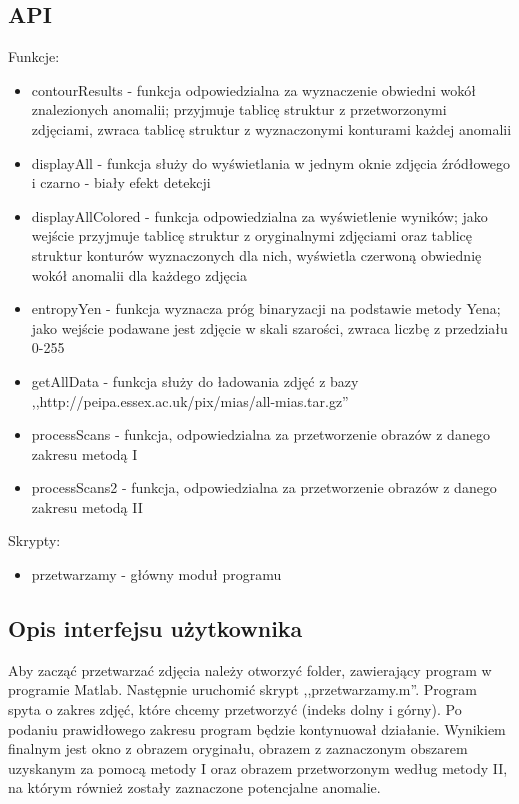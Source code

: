 \documentclass[11pt,openany]{sprawozdanie-agh}
\begin{document}
\subsection{API}
Funkcje:
\begin{itemize}
\item contourResults - funkcja odpowiedzialna za wyznaczenie obwiedni wokół znalezionych anomalii; przyjmuje tablicę struktur z przetworzonymi zdjęciami, zwraca tablicę struktur z wyznaczonymi konturami każdej anomalii
\item displayAll - funkcja służy do wyświetlania w jednym oknie zdjęcia źródłowego i czarno - biały efekt detekcji
\item displayAllColored - funkcja odpowiedzialna za wyświetlenie wyników; jako wejście przyjmuje tablicę struktur z oryginalnymi zdjęciami oraz tablicę struktur konturów wyznaczonych dla nich, wyświetla czerwoną obwiednię wokół anomalii dla każdego zdjęcia
\item entropyYen - funkcja wyznacza próg binaryzacji na podstawie metody Yena; jako wejście podawane jest zdjęcie w skali szarości, zwraca liczbę z przedziału 0-255
\item getAllData - funkcja służy do ładowania zdjęć z bazy ,,http://peipa.essex.ac.uk/pix/mias/all-mias.tar.gz''
\item processScans - funkcja, odpowiedzialna za przetworzenie obrazów z danego zakresu metodą I
\item processScans2 - funkcja, odpowiedzialna za przetworzenie obrazów z danego zakresu metodą II
\end{itemize}
Skrypty:
\begin{itemize}
\item przetwarzamy - główny moduł programu
\end{itemize}

\subsection{Opis interfejsu użytkownika}
Aby zacząć przetwarzać zdjęcia należy otworzyć folder, zawierający program w programie Matlab. Następnie uruchomić skrypt ,,przetwarzamy.m''. Program spyta o zakres zdjęć, które chcemy przetworzyć (indeks dolny i górny). Po podaniu prawidłowego zakresu program będzie kontynuował działanie. Wynikiem finalnym jest okno z obrazem oryginału, obrazem z zaznaczonym obszarem uzyskanym za pomocą metody I oraz obrazem przetworzonym według metody II, na którym również zostały zaznaczone potencjalne anomalie.



\end{document}

